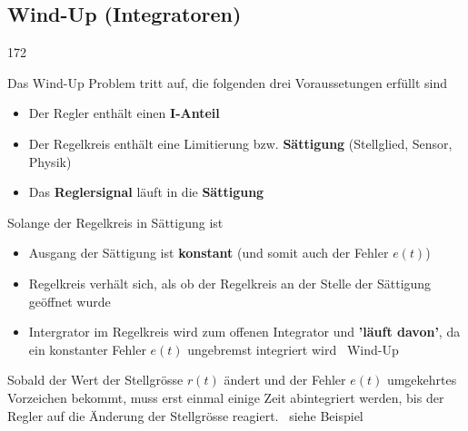 \subsection{Wind-Up (Integratoren)}{172}

Das Wind-Up Problem tritt auf, die folgenden drei Voraussetungen erfüllt sind

\begin{itemize}
    \item Der Regler enthält einen \textbf{I-Anteil}
    \item Der Regelkreis enthält eine Limitierung bzw. \textbf{Sättigung} (Stellglied, Sensor, Physik)
    \item Das \textbf{Reglersignal} läuft in die \textbf{Sättigung}
\end{itemize}

\vspace{0.2cm}
Solange der Regelkreis in Sättigung ist

\begin{itemize}
    \item Ausgang der Sättigung ist \textbf{konstant} (und somit auch der Fehler $e(t)$)
    \item Regelkreis verhält sich, als ob der Regelkreis an der Stelle der Sättigung geöffnet wurde
    \item Intergrator im Regelkreis wird zum offenen Integrator und \textbf{'läuft davon'}, da ein konstanter Fehler $e(t)$ ungebremst
        integriert wird \textrightarrow\ Wind-Up
\end{itemize}

\vspace{0.2cm}
Sobald der Wert der Stellgrösse $r(t)$ ändert und der Fehler $e(t)$ umgekehrtes Vorzeichen bekommt, muss erst einmal einige Zeit
abintegriert werden, bis der Regler auf die Änderung der Stellgrösse reagiert. \textrightarrow\ siehe Beispiel



